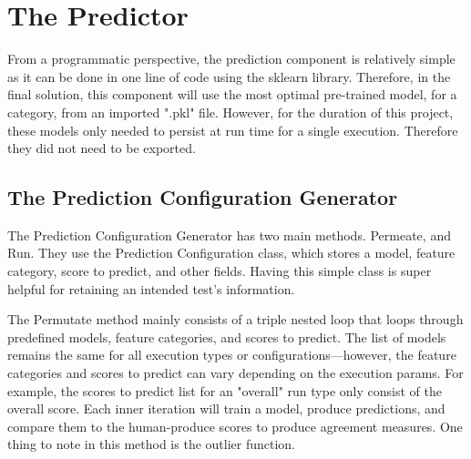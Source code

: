 \section{The Predictor}

From a programmatic perspective, the prediction component is relatively simple as it can be done in one line of code using the sklearn library. Therefore, in the final solution, this component will use the most optimal pre-trained model, for a category, from an imported ".pkl" file. However, for the duration of this project, these models only needed to persist at run time for a single execution. Therefore they did not need to be exported. 


\subsection{The Prediction Configuration Generator}

The Prediction Configuration Generator has two main methods. Permeate, and Run. They use the Prediction Configuration class, which stores a model, feature category, score to predict, and other fields. 
Having this simple class is super helpful for retaining an intended test's information.

The Permutate method mainly consists of a triple nested loop that loops through predefined models, feature categories, and scores to predict. The list of models remains the same for all execution types or configurations—however, the feature categories and scores to predict can vary depending on the execution params. For example, the scores to predict list for an "overall" run type only consist of the overall score. Each inner iteration will train a model, produce predictions, and compare them to the human-produce scores to produce agreement measures. One thing to note in this method is the outlier function. 


